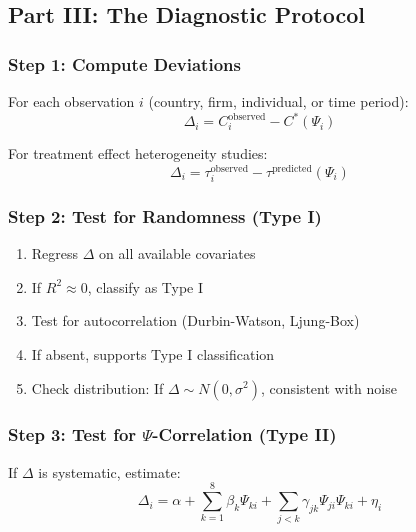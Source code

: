 \subsection{Part III: The Diagnostic Protocol}

\subsubsection{Step 1: Compute Deviations}

For each observation $i$ (country, firm, individual, or time period):
\begin{equation}
\Delta_i = C_i^{\text{observed}} - C^*(\Psi_i)
\end{equation}

For treatment effect heterogeneity studies:
\begin{equation}
\Delta_i = \tau_i^{\text{observed}} - \tau^{\text{predicted}}(\Psi_i)
\end{equation}

\subsubsection{Step 2: Test for Randomness (Type I)}

\begin{enumerate}
    \item Regress $\Delta$ on all available covariates
    \item If $R^2 \approx 0$, classify as Type I
    \item Test for autocorrelation (Durbin-Watson, Ljung-Box)
    \item If absent, supports Type I classification
    \item Check distribution: If $\Delta \sim N(0, \sigma^2)$, consistent with noise
\end{enumerate}

\subsubsection{Step 3: Test for $\Psi$-Correlation (Type II)}

If $\Delta$ is systematic, estimate:
\begin{equation}
\Delta_i = \alpha + \sum_{k=1}^{8} \beta_k \Psi_{ki} + \sum_{j < k} \gamma_{jk} \Psi_{ji} \Psi_{ki} + \eta_i
\end{equation}

